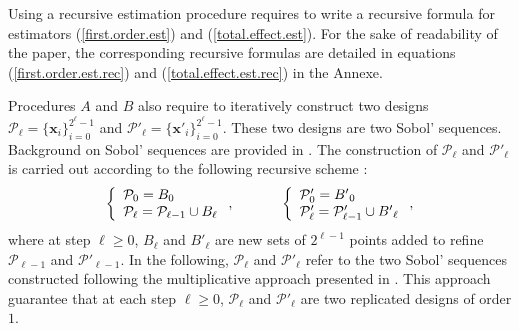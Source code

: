 \documentclass[]{elsarticle}
\theoremstyle{definition}
\newcommand{\bvec}[1]{\boldsymbol{#1}}
\newcommand{\vx}{\bvec{x}}
\begin{document}
Using a recursive estimation procedure requires to write a recursive formula for estimators (\ref{first.order.est}) and (\ref{total.effect.est}). For the sake of readability of the paper, the corresponding recursive formulas are detailed in equations (\ref{first.order.est.rec}) and (\ref{total.effect.est.rec}) in the Annexe.

Procedures $A$ and $B$ also require to iteratively construct two designs $\mathcal{P}_\ell=\{\vx_i\}_{i=0}^{2^\ell-1}$ and $\mathcal{P}'_\ell=\{{\vx'}_i\}_{i=0}^{2^\ell-1}$. These two designs are two Sobol' sequences. Background on Sobol' sequences are provided in \cite{crass}. The construction of $\mathcal{P}_\ell$ and $\mathcal{P}'_\ell$ is carried out according to the following recursive scheme :
\begin{equation}
\left\lbrace \begin{array}{l}
\mathcal{P}_0= B_0 \\
\mathcal{P}_\ell= \mathcal{P}_{\ell-1} \cup B_\ell \end{array}\right. ,\qquad
\hspace*{0.5cm}
\left\lbrace \begin{array}{l}
\mathcal{P}'_0= {B'}_0 \\
\mathcal{P}'_\ell= \mathcal{P}'_{\ell-1} \cup {B'}_\ell \end{array}\right.,
\label{rec.scheme}
\end{equation}
where at step $\ell\geq0$, $B_\ell$ and $B'_\ell$ are new sets of $2^{\ell-1}$ points added to refine $\mathcal{P}_{\ell-1}$ and $\mathcal{P}'_{\ell-1}$. In the following, $\mathcal{P}_\ell$ and $\mathcal{P}'_\ell$ refer to the two Sobol' sequences constructed following the multiplicative approach presented in \cite{crass}. This approach guarantee that at each step $\ell\geq0$, $\mathcal{P}_{\ell}$ and $\mathcal{P}'_{\ell}$ are two replicated designs of order $1$.
\end{document}
